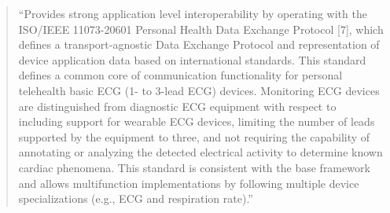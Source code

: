 \begin{quote}

``Provides strong application level interoperability by operating with the ISO/IEEE 11073-20601 Personal Health Data Exchange Protocol [7], which defines a transport-agnostic Data Exchange Protocol and representation of device application data based on international standards. This standard defines a common core of communication functionality for personal telehealth basic ECG (1- to 3-lead ECG) devices. Monitoring ECG devices are distinguished from diagnostic ECG equipment with respect to including support for wearable ECG devices, limiting the number of leads supported by the equipment to three, and not requiring the capability of annotating or analyzing the detected electrical activity to determine known cardiac phenomena. This standard is consistent with the base framework and allows multifunction implementations by following multiple device specializations (e.g., ECG and respiration rate).'' \cite{newRef:18}

\end{quote}




